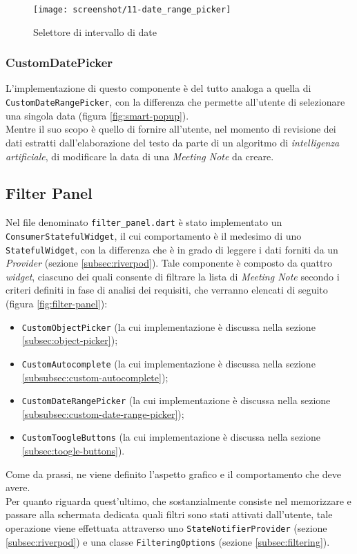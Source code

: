 \begin{figure}[!h] 
    \centering 
    \texttt{[image: screenshot/11-date\_range\_picker]} 
    \caption{Selettore di intervallo di date}
    \label{fig:date-range-picker}
\end{figure}

\subsubsection*{CustomDatePicker}
\label{subsubsec:custom-date-picker}

L'implementazione di questo componente è del tutto analoga a quella di \lstinline{CustomDateRangePicker}, con la differenza che permette all'utente di selezionare una singola data (figura \ref{fig:smart-popup}).\\
Mentre il suo scopo è quello di fornire all'utente, nel momento di revisione dei dati estratti dall'elaborazione del testo da parte di un algoritmo di \emph{intelligenza artificiale}, di modificare la data di una \emph{Meeting Note} da creare.

\subsection{Filter Panel}
\label{subsec:filter-panel}

Nel file denominato \lstinline{filter_panel.dart} è stato implementato un \lstinline{ConsumerStatefulWidget}\cite{site:reading-provider}, il cui comportamento è il medesimo di uno \lstinline{StatefulWidget}, con la differenza che è in grado di leggere i dati forniti da un \emph{Provider} (sezione \ref{subsec:riverpod}).
Tale componente è composto da quattro \emph{widget}, ciascuno dei quali consente di filtrare la lista di \emph{Meeting Note}  secondo i criteri definiti in fase di analisi dei requisiti, che verranno elencati di seguito (figura \ref{fig:filter-panel}):
\begin{itemize}
    \item \lstinline{CustomObjectPicker} (la cui implementazione è discussa nella sezione \ref{subsec:object-picker});
    \item \lstinline{CustomAutocomplete} (la cui implementazione è discussa nella sezione \ref{subsubsec:custom-autocomplete});
    \item \lstinline{CustomDateRangePicker} (la cui implementazione è discussa nella sezione \ref{subsubsec:custom-date-range-picker});
    \item \lstinline{CustomToogleButtons} (la cui implementazione è discussa nella sezione \ref{subsec:toogle-buttons}).
\end{itemize}
Come da prassi, ne viene definito l'aspetto grafico e il comportamento che deve avere.\\
Per quanto riguarda quest'ultimo, che sostanzialmente consiste nel memorizzare e passare alla schermata dedicata quali filtri sono stati attivati dall'utente, tale operazione viene effettuata attraverso uno \lstinline{StateNotifierProvider} (sezione \ref{subsec:riverpod}) e una classe \lstinline{FilteringOptions} (sezione \ref{subsec:filtering}).

